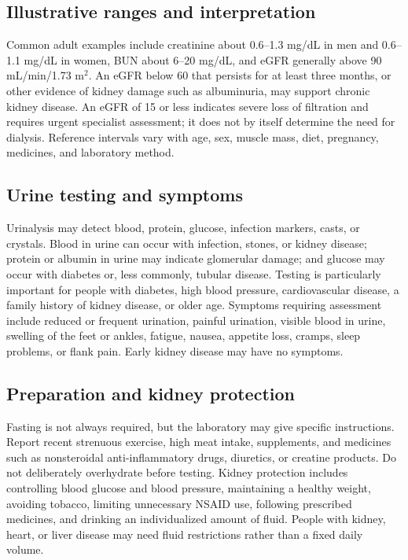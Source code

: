 \documentclass[11pt,openany]{book}
\begin{document}
\subsection*{Illustrative ranges and interpretation}
Common adult examples include creatinine about 0.6--1.3 mg/dL in men and
0.6--1.1 mg/dL in women, BUN about 6--20 mg/dL, and eGFR generally above 90
mL/min/1.73 m$^2$. An eGFR below 60 that persists for at least three months, or
other evidence of kidney damage such as albuminuria, may support chronic kidney
disease. An eGFR of 15 or less indicates severe loss of filtration and requires
urgent specialist assessment; it does not by itself determine the need for
dialysis. Reference intervals vary with age, sex, muscle mass, diet, pregnancy,
medicines, and laboratory method.

\subsection*{Urine testing and symptoms}
Urinalysis may detect blood, protein, glucose, infection markers, casts, or
crystals. Blood in urine can occur with infection, stones, or kidney disease;
protein or albumin in urine may indicate glomerular damage; and glucose may
occur with diabetes or, less commonly, tubular disease. Testing is particularly
important for people with diabetes, high blood pressure, cardiovascular disease,
a family history of kidney disease, or older age. Symptoms requiring assessment
include reduced or frequent urination, painful urination, visible blood in
urine, swelling of the feet or ankles, fatigue, nausea, appetite loss, cramps,
sleep problems, or flank pain. Early kidney disease may have no symptoms.

\subsection*{Preparation and kidney protection}
Fasting is not always required, but the laboratory may give specific
instructions. Report recent strenuous exercise, high meat intake, supplements,
and medicines such as nonsteroidal anti-inflammatory drugs, diuretics, or
creatine products. Do not deliberately overhydrate before testing. Kidney
protection includes controlling blood glucose and blood pressure, maintaining a
healthy weight, avoiding tobacco, limiting unnecessary NSAID use, following
prescribed medicines, and drinking an individualized amount of fluid. People
with kidney, heart, or liver disease may need fluid restrictions rather than a
fixed daily volume.
\end{document}
